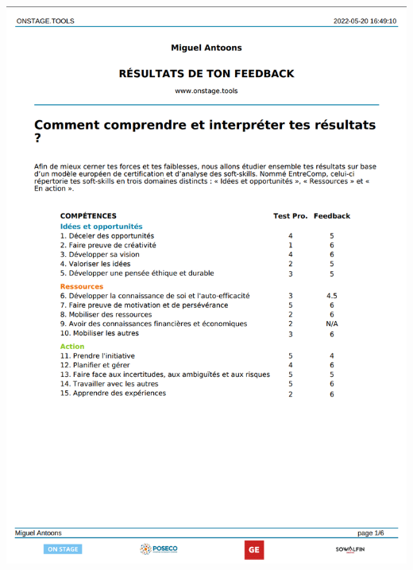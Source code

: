 \documentclass[11pt]{article}
\begin{document}
\includegraphics*[scale=0.36]{Screenshot from 2022-05-22 21-03-42.png}

\newpage
\end{document}

